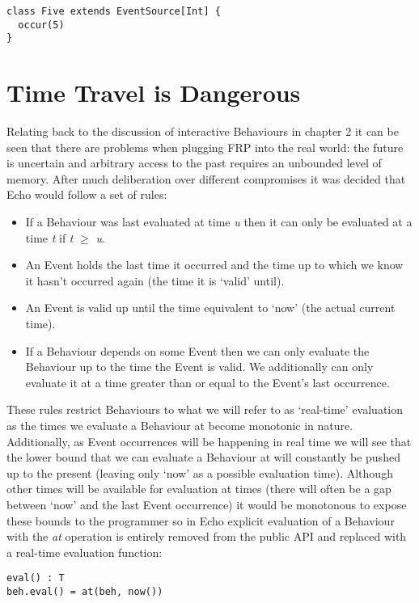 \begin{verbatim}
class Five extends EventSource[Int] {
  occur(5)
}
\end{verbatim} 

  \section{Time Travel is Dangerous}
    Relating back to the discussion of interactive Behaviours in chapter 2 it can be seen
    that there are problems when plugging FRP into the real world: the future is uncertain and
    arbitrary access to the past requires an unbounded level of memory. After much deliberation
    over different compromises it was decided that Echo would follow a set of rules:
    
    \begin{itemize}
      \item If a Behaviour was last evaluated at time \emph{u} then it can only be evaluated at
      a time \emph{t} if \emph{t} $\geq$ \emph{u}.
      \item An Event holds the last time it occurred and the time up to which we know it hasn't occurred
      again (the time it is `valid' until).
      \item An Event is valid up until the time equivalent to `now' (the actual current time).
      \item If a Behaviour depends on some Event then we can only evaluate the Behaviour up to
      the time the Event is valid. We additionally can only evaluate it at a time greater than
      or equal to the Event's last occurrence.
    \end{itemize}
    
    These rules restrict Behaviours to what we will refer to as `real-time' evaluation as the times
    we evaluate a Behaviour at become monotonic in nature. Additionally, as Event occurrences will
    be happening in real time we will see that the lower bound that we can evaluate a Behaviour at will
    constantly be pushed up to the present (leaving only `now' as a possible evaluation time). Although
    other times will be available for evaluation at times (there will often be a gap between `now' and
    the last Event occurrence) it would be monotonous to expose these bounds to the programmer so
    in Echo explicit evaluation of a Behaviour with the
    \emph{at} operation is entirely removed from the public API and replaced with a real-time evaluation function:

\begin{verbatim}
eval() : T
beh.eval() = at(beh, now())
\end{verbatim}  

